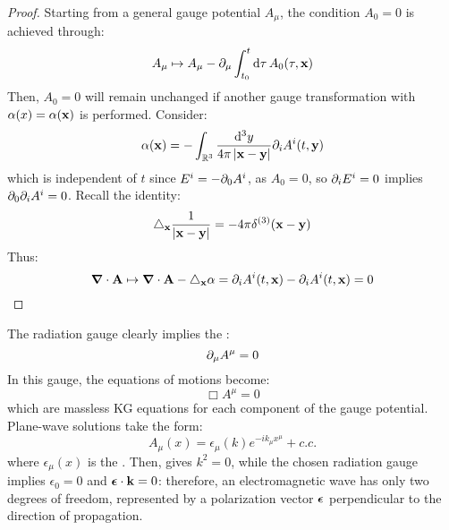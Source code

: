 \begin{proofbox}
  \begin{proof}
    Starting from a general gauge potential $ A_\mu $, the condition $ A_0 = 0 $ is achieved through:
    \begin{equation*}
      A_\mu \mapsto A_\mu - \partial_\mu \int_{t_0}^t \mathrm{d}\tau\, A_0(\tau,\mathbf{x})
    \end{equation*}
    Then, $ A_0 = 0 $ will remain unchanged if another gauge transformation with $ \alpha(x) = \alpha(\mathbf{x}) $ is performed. Consider:
    \begin{equation*}
      \alpha(\mathbf{x}) = - \int_{\mathbb{R}^3} \frac{\mathrm{d}^3y}{4\pi \left\lvert\mathbf{x} - \mathbf{y}\right\rvert} \partial_i A^i(t,\mathbf{y})
    \end{equation*}
    which is independent of $ t $ since $ E^i = -\partial_0 A^i $, as $ A_0 = 0 $, so $ \partial_i E^i = 0 $ implies $ \partial_0 \partial_i A^i = 0 $. Recall the identity:
    \begin{equation}
      \triangle_{\mathbf{x}} \frac{1}{\left\lvert\mathbf{x} - \mathbf{y}\right\rvert} = - 4\pi \delta^{(3)}(\mathbf{x} - \mathbf{y})
    \end{equation}
    Thus:
    \begin{equation*}
      \boldsymbol{\nabla} \cdot \mathbf{A} \mapsto \boldsymbol{\nabla} \cdot \mathbf{A} - \triangle_{\mathbf{x}} \alpha = \partial_i A^i(t,\mathbf{x}) - \partial_i A^i(t,\mathbf{x}) = 0
    \end{equation*}
  \end{proof}
\end{proofbox}

The radiation gauge clearly implies the :
\begin{equation}
  \partial_\mu A^\mu = 0
\end{equation}
In this gauge, the equations of motions  become:
\begin{equation}
  \Box A^\mu = 0
  \label{eq:maxw-lor}
\end{equation}
which are massless KG equations for each component of the gauge potential. Plane-wave solutions take the form:
\begin{equation}
  A_\mu(x) = \epsilon_\mu(k) e^{-i k_\mu x^\mu} + c.c.
\end{equation}
where $ \epsilon_\mu(x) $ is the . Then,  gives $ k^2 = 0 $, while the chosen radiation gauge implies $ \epsilon_0 = 0 $ and $ \boldsymbol{\epsilon} \cdot \mathbf{k} = 0 $: therefore, an electromagnetic wave has only two degrees of freedom, represented by a polarization vector $ \boldsymbol{\epsilon} $ perpendicular to the direction of propagation.

